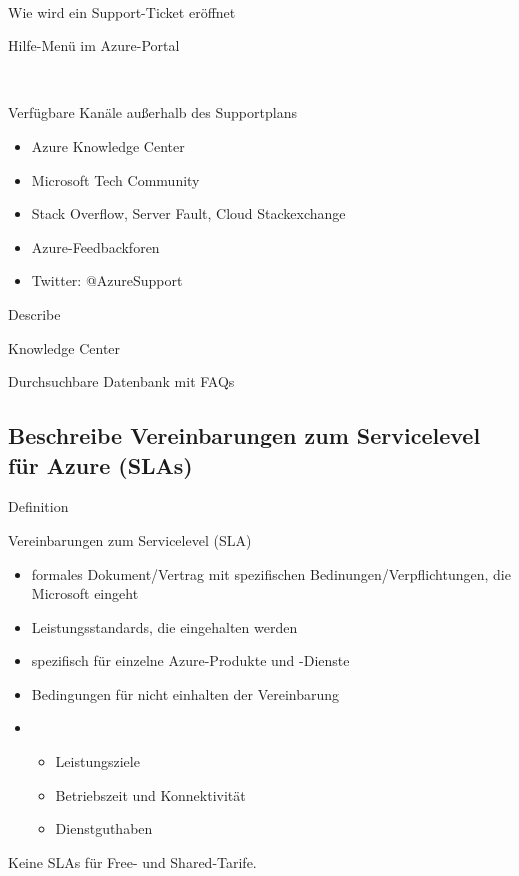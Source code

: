 \documentclass{scrartcl}
\newenvironment{flashcard}[2][]{%
    #1
    \vfill
    \centerline{\Large{#2}}
    \vfill
\newpage
}
{\newpage}
\newcommand{\subsectioncard}[1]{
    \vspace*{\stretch{1}}
    \subsection{#1}
    \vspace*{\stretch{1}}
    \pagebreak
}
\begin{document}
    \begin{flashcard}[\ ]{Wie wird ein Support-Ticket eröffnet}
        Hilfe-Menü im Azure-Portal
    \end{flashcard}

    \begin{flashcard}[\ ]{Verfügbare Kanäle außerhalb des Supportplans}
        \begin{itemize}
            \item Azure Knowledge Center
            \item Microsoft Tech Community
            \item Stack Overflow, Server Fault, Cloud Stackexchange
            \item Azure-Feedbackforen
            \item Twitter: @AzureSupport
        \end{itemize}

    \end{flashcard}

    \begin{flashcard}[Describe]{Knowledge Center}
        Durchsuchbare Datenbank mit FAQs
    \end{flashcard}

    \subsectioncard{Beschreibe Vereinbarungen zum Servicelevel für Azure (SLAs)}

    \begin{flashcard}[Definition]{Vereinbarungen zum Servicelevel (SLA)}
        \begin{itemize}
            \item formales Dokument/Vertrag mit spezifischen Bedinungen/Verpflichtungen, die Microsoft eingeht
            \item Leistungsstandards, die eingehalten werden
            \item spezifisch für einzelne Azure-Produkte und -Dienste
            \item Bedingungen für nicht einhalten der Vereinbarung
            \item
                \begin{itemize}
                    \item Leistungsziele
                    \item Betriebszeit und Konnektivität
                    \item Dienstguthaben
                \end{itemize}

        \end{itemize}
        Keine SLAs für Free- und Shared-Tarife.
    \end{flashcard}
\end{document}
